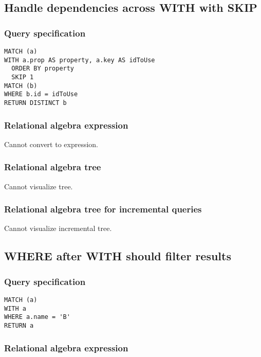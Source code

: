 \subsection{Handle dependencies across WITH with SKIP}

\subsubsection*{Query specification}

\begin{lstlisting}
MATCH (a)
WITH a.prop AS property, a.key AS idToUse
  ORDER BY property
  SKIP 1
MATCH (b)
WHERE b.id = idToUse
RETURN DISTINCT b
\end{lstlisting}

\subsubsection*{Relational algebra expression}

Cannot convert to expression.

\subsubsection*{Relational algebra tree}

Cannot visualize tree.

\subsubsection*{Relational algebra tree for incremental queries}

Cannot visualize incremental tree.

\subsection{WHERE after WITH should filter results}

\subsubsection*{Query specification}

\begin{lstlisting}
MATCH (a)
WITH a
WHERE a.name = 'B'
RETURN a
\end{lstlisting}

\subsubsection*{Relational algebra expression}

